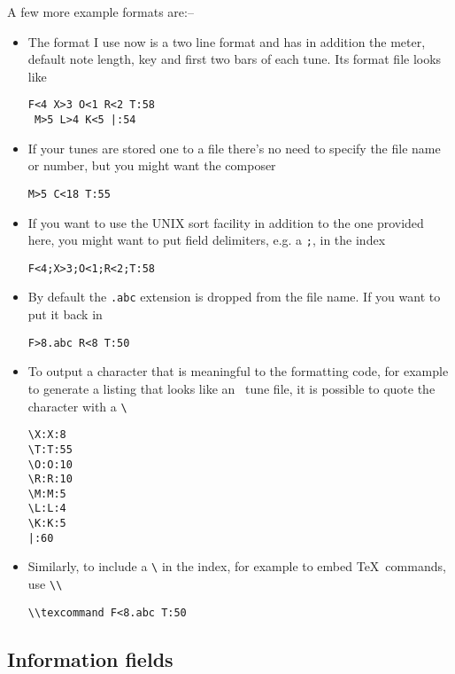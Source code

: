 A few more example formats are:--
\begin{itemize}
\item The format I use now is a two line format and has in addition the meter,
default note length, key and first two bars of each tune. Its format file looks
like
\begin{verbatim}
F<4 X>3 O<1 R<2 T:58
 M>5 L>4 K<5 |:54
\end{verbatim}
\item If your tunes are stored one to a file there's no need to specify the
file name or number, but you might want the composer
\begin{verbatim}
M>5 C<18 T:55
\end{verbatim}
\item If you want to use the UNIX sort facility in addition to the one provided
here, you might want to put field delimiters, e.g. a {\tt ;}, in the index
\begin{verbatim}
F<4;X>3;O<1;R<2;T:58
\end{verbatim}
\item By default the {\tt .abc} extension is dropped from the file name. If you
want to put it back in
\begin{verbatim}
F>8.abc R<8 T:50
\end{verbatim}
\item To output a character that is meaningful to the formatting
code, for example to generate a listing that looks like an \abc\
tune file, it is possible to quote the character with a \verb+\+
\begin{verbatim}
\X:X:8
\T:T:55
\O:O:10
\R:R:10
\M:M:5
\L:L:4
\K:K:5
|:60

\end{verbatim}
\item Similarly, to include a \verb+\+ in the index, for example to embed
\TeX\ commands, use \verb+\\+
\begin{verbatim}
\\texcommand F<8.abc T:50
\end{verbatim}
\end{itemize}

\subsection{Information fields} \label{sec:info}

